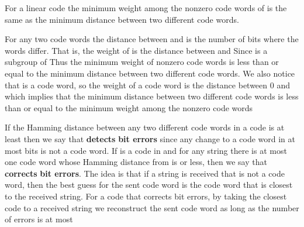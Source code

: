 \documentclass[11pt,oneside]{article}
\begin{document}
\BookNarrativetrue

\begin{BookBody}

 For a linear code  the minimum weight among the nonzero code words of  is the same as the minimum distance between two different code words.

 For any two code words  the distance between  and  is the number of bits where the words differ. That is, the weight of  is the distance between  and  Since  is a subgroup of  Thus the minimum weight of nonzero code words is less than or equal to the minimum distance between two different code words. We also notice that  is a code word, so the weight of a code word  is the distance between 0 and  which implies that the minimum distance between two different code words is less than or equal to the minimum weight among the nonzero code words\BookEnd{\blacklozenge}

If the Hamming distance between any two different code words in a code  is at least  then we say that  \textbf{detects}  \textbf{bit errors} since any change to a code word in at most  bits is not a code word. If  is a code in  and for any string  there is at most one code word whose Hamming distance from  is  or less, then we say that  \textbf{corrects}  \textbf{bit errors}. The idea is that if a string is received that is not a code word, then the best guess for the sent code word is the code word that is closest to the received string. For a code that corrects  bit errors, by taking the closest code to a received string we reconstruct the sent code word as long as the number of errors is at most 


\end{BookBody}
\end{document}

